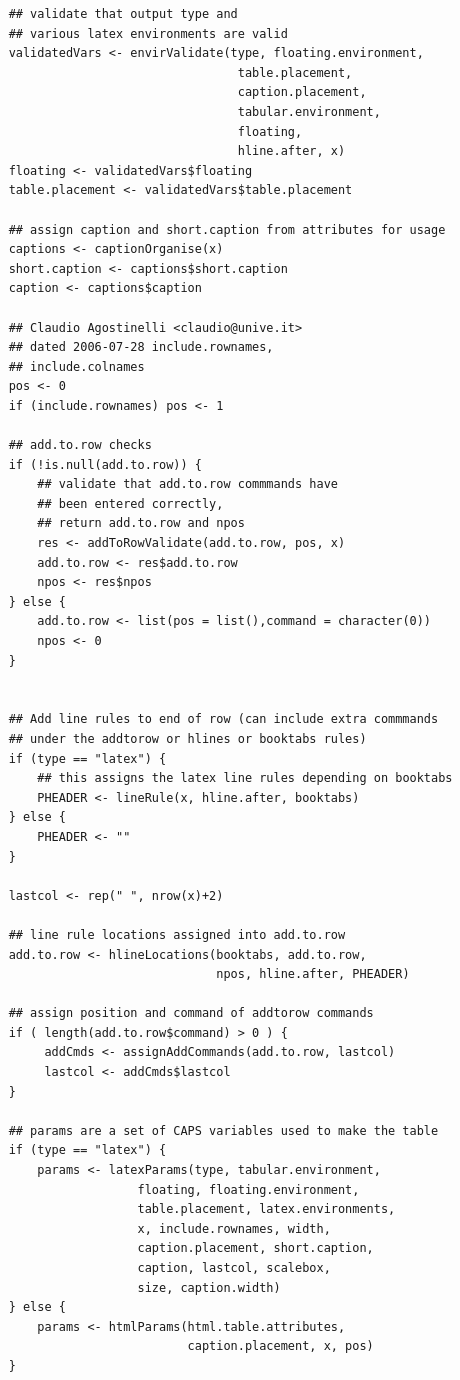 \documentclass{memoir}\usepackage[]{graphicx}\usepackage[]{color}
\begin{document}
\begin{lstlisting}
    ## validate that output type and 
    ## various latex environments are valid
    validatedVars <- envirValidate(type, floating.environment, 
                                    table.placement, 
                                    caption.placement, 
                                    tabular.environment, 
                                    floating, 
                                    hline.after, x)
    floating <- validatedVars$floating
    table.placement <- validatedVars$table.placement

    ## assign caption and short.caption from attributes for usage
    captions <- captionOrganise(x)
    short.caption <- captions$short.caption
    caption <- captions$caption

    ## Claudio Agostinelli <claudio@unive.it> 
    ## dated 2006-07-28 include.rownames,
    ## include.colnames
    pos <- 0
    if (include.rownames) pos <- 1

    ## add.to.row checks
    if (!is.null(add.to.row)) {
        ## validate that add.to.row commmands have 
        ## been entered correctly, 
        ## return add.to.row and npos
        res <- addToRowValidate(add.to.row, pos, x)
        add.to.row <- res$add.to.row
        npos <- res$npos
    } else {
        add.to.row <- list(pos = list(),command = character(0))
        npos <- 0
    }

    
    ## Add line rules to end of row (can include extra commmands 
    ## under the addtorow or hlines or booktabs rules)
    if (type == "latex") {
        ## this assigns the latex line rules depending on booktabs
        PHEADER <- lineRule(x, hline.after, booktabs)
    } else {
        PHEADER <- ""
    }

    lastcol <- rep(" ", nrow(x)+2)

    ## line rule locations assigned into add.to.row
    add.to.row <- hlineLocations(booktabs, add.to.row, 
                                 npos, hline.after, PHEADER) 

    ## assign position and command of addtorow commands
    if ( length(add.to.row$command) > 0 ) {
         addCmds <- assignAddCommands(add.to.row, lastcol)
         lastcol <- addCmds$lastcol
    }

    ## params are a set of CAPS variables used to make the table
    if (type == "latex") {
        params <- latexParams(type, tabular.environment, 
                      floating, floating.environment, 
                      table.placement, latex.environments,
                      x, include.rownames, width, 
                      caption.placement, short.caption, 
                      caption, lastcol, scalebox, 
                      size, caption.width)
    } else {
        params <- htmlParams(html.table.attributes, 
                             caption.placement, x, pos)
    }


\end{lstlisting}
\end{document}
